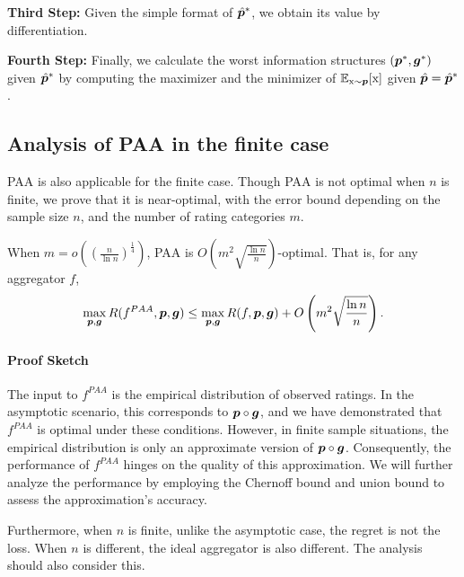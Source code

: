 
\textbf{Third Step:} Given the simple format of $\hat{{\bm{p}}}^*$, we obtain its value by differentiation.

\textbf{Fourth Step:} Finally, we calculate the worst information structures $({\bm{p}}^*,{\bm{g}}^*)$ given $\hat{{\bm{p}}}^*$ by computing the maximizer and the minimizer of $\mathbb{E}_{{\textnormal{x}}\sim{\bm{p}}}[{\textnormal{x}}]$ given $\hat{{\bm{p}}}=\hat{{\bm{p}}}^*$. 

\subsection{Analysis of PAA in the finite case}

PAA is also applicable for the finite case. Though PAA is not optimal when $n$ is finite, we prove that it is near-optimal, with the error bound depending on the sample size $n$, and the number of rating categories $m$.

\begin{theorem}\label{thm:finite}
When $m=o\left((\frac{n}{\ln n})^{\frac{1}{4}}\right)$, PAA is $O\left(m^2\sqrt{\frac{\ln n}{n}}\right)$-optimal. That is, for any aggregator $f$,
$$\max_{{\bm{p}},{\bm{g}}} R(f^{PAA},{\bm{p}},{\bm{g}})\le \max_{{\bm{p}},{\bm{g}}} R(f,{\bm{p}},{\bm{g}})+O\left(m^2\sqrt{\frac{\ln n}{n}}\right).$$ 
\end{theorem}

\paragraph{Proof Sketch}
The input to \( f^{PAA} \) is the empirical distribution of observed ratings. In the asymptotic scenario, this corresponds to \( {\bm{p}} \circ {\bm{g}} \), and we have demonstrated that \( f^{PAA} \) is optimal under these conditions. However, in finite sample situations, the empirical distribution is only an approximate version of \( {\bm{p}} \circ {\bm{g}} \). Consequently, the performance of \( f^{PAA} \) hinges on the quality of this approximation. We will further analyze the performance by employing the Chernoff bound and union bound to assess the approximation's accuracy.

Furthermore, when $n$ is finite, unlike the asymptotic case, the regret is not the loss. When $n$ is different, the ideal aggregator is also different. The analysis should also consider this. 


